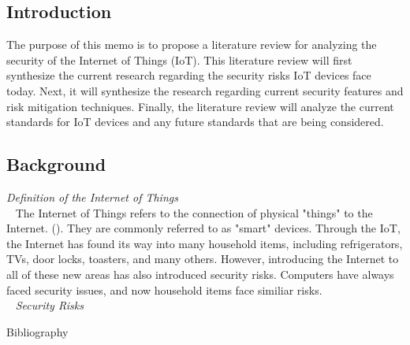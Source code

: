 \documentclass[letterpaper, 12pt]{texMemo}
\begin{document}
\maketitle
\begin{flushleft}
\subsection*{Introduction}
The purpose of this memo is to propose a literature review for analyzing the security of the Internet of Things (IoT). 
This literature review will first synthesize the current research regarding the security risks IoT devices face today. 
Next, it will synthesize the research regarding current security features and risk mitigation techniques.  
Finally, the literature review will analyze the current standards for IoT devices and any future standards that are being considered.  

\subsection*{Background}
\textit{Definition of the Internet of Things}\\ 
~\newline
  The Internet of Things refers to the connection of physical "things" to the Internet. (\cite{Kozlov}). They are commonly referred to as "smart" devices. 
Through the IoT, the Internet has found its way into many household items, including refrigerators, TVs, door locks, toasters, and many others. 
However, introducing the Internet to all of these new areas has also introduced security risks. Computers have always faced security issues, and now household items
face similiar risks.\\ 
~\newline
\textit{Security Risks}
~\newline


\newpage
Bibliography\\
~\newline
\end{flushleft}
\end{document}
